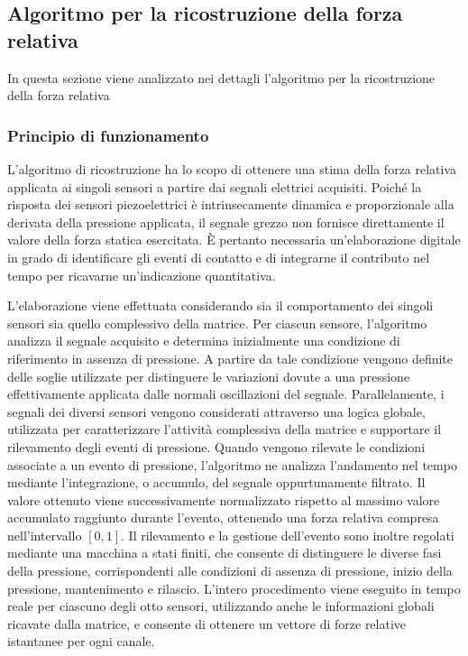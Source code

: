 \documentclass[10pt, a4paper]{article}
\begin{document}
        \subsection{Algoritmo per la ricostruzione della forza relativa}
            In questa sezione viene analizzato nei dettagli l'algoritmo per la ricostruzione della forza relativa

            \subsubsection{Principio di funzionamento}
                L'algoritmo di ricostruzione ha lo scopo di ottenere una stima della forza relativa applicata ai singoli sensori a partire dai segnali elettrici acquisiti. Poiché 
                la risposta dei sensori piezoelettrici è intrinsecamente dinamica e proporzionale alla derivata della pressione applicata, il segnale 
                grezzo non fornisce direttamente il valore della forza statica esercitata. È pertanto necessaria un'elaborazione digitale in grado di identificare
                gli eventi di contatto e di integrarne il contributo nel tempo per ricavarne un'indicazione quantitativa.
                
                L'elaborazione viene 
                effettuata considerando sia il comportamento dei singoli sensori sia quello complessivo della matrice. Per ciascun sensore, l'algoritmo analizza il segnale acquisito e 
                determina inizialmente una condizione di riferimento in assenza di pressione. A partire da tale condizione vengono definite delle soglie utilizzate per distinguere le variazioni 
                dovute a una pressione effettivamente applicata dalle normali oscillazioni del segnale. Parallelamente, i segnali dei diversi sensori vengono considerati attraverso una logica globale, 
                utilizzata per caratterizzare l'attività complessiva della matrice e supportare il rilevamento degli eventi di pressione. 
                Quando vengono rilevate le condizioni associate a un 
                evento di pressione, l'algoritmo ne analizza l'andamento nel tempo mediante l'integrazione, o accumulo, del segnale oppurtunamente filtrato.
                Il valore ottenuto viene successivamente normalizzato rispetto al massimo valore accumulato raggiunto durante l'evento, ottenendo una forza relativa compresa nell'intervallo
                $[0,1]$. Il rilevamento e la 
                gestione dell'evento sono inoltre regolati mediante una macchina a stati finiti, che consente di distinguere le diverse fasi della pressione, corrispondenti alle condizioni di assenza di 
                pressione, inizio della pressione, mantenimento e rilascio.
                L'intero procedimento viene eseguito in tempo reale per ciascuno degli otto sensori, utilizzando anche le informazioni
                globali ricavate dalla matrice, e consente di ottenere un vettore di forze relative istantanee per ogni canale.
\end{document}
